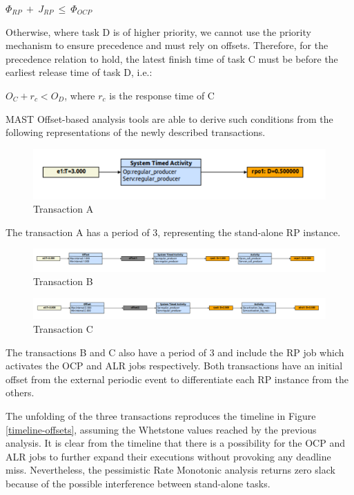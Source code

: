 \documentclass{article}
\begin{document}
$\Phi_{RP}\ +\ J_{RP}\ \le\ \Phi_{OCP}$

Otherwise, where task D is of higher priority, we cannot use the priority mechanism to ensure precedence and must rely on offsets. Therefore, for the precedence relation to hold, the latest finish time of task C must be before the earliest release time of task D, i.e.:

$O_C + r_c < O_D$, where $r_c$ is the response time of C

MAST Offset-based analysis tools are able to derive such conditions from the following representations of the newly described transactions.

\begin{figure}[!htbp]
\centering
\includegraphics[width=5in]{images/transaction-rp-offset}
\caption{Transaction A}
\label{transaction-rp-offset}
\end{figure}

The transaction A has a period of 3, representing the stand-alone RP instance.

\begin{figure}[!htbp]
\centering
\includegraphics[width=6.5in]{images/transaction-ocp-offset}
\caption{Transaction B}
\label{transaction-ocp-offset}
\end{figure}

\begin{figure}[!htbp]
\centering
\includegraphics[width=6.5in]{images/transaction-alr-offset}
\caption{Transaction C}
\label{transaction-alr-offset}
\end{figure}

The transactions B and C also have a period of 3 and include the RP job which activates the OCP and ALR jobs respectively. Both transactions have an initial offset from the external periodic event to differentiate each RP instance from the others.

The unfolding of the three transactions reproduces the timeline in Figure \ref{timeline-offsets}, assuming the Whetstone values reached by the previous analysis. It is clear from the timeline that there is a possibility for the OCP and ALR jobs to further expand their executions without provoking any deadline miss. Nevertheless, the pessimistic Rate Monotonic analysis returns zero slack because of the possible interference between stand-alone tasks.
\end{document}
